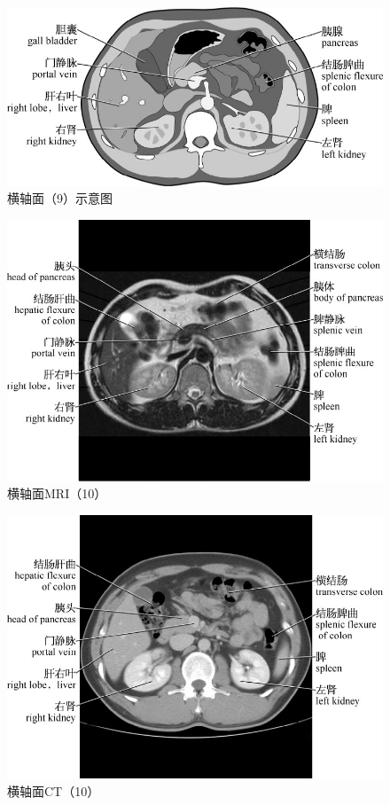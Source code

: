 \begin{figure}[!htbp]
 \centering
 \includegraphics{./images/Image00028.jpg}
 \captionsetup{justification=centering}
 \caption{横轴面（9）示意图}
  \end{figure} 
 \FloatBarrier

\begin{figure}[!htbp]
 \centering
 \includegraphics{./images/Image00029.jpg}
 \captionsetup{justification=centering}
 \caption{横轴面MRI（10）}
  \end{figure} 
 \FloatBarrier

\begin{figure}[!htbp]
 \centering
 \includegraphics{./images/Image00030.jpg}
 \captionsetup{justification=centering}
 \caption{横轴面CT（10）}
  \end{figure} 
 \FloatBarrier

